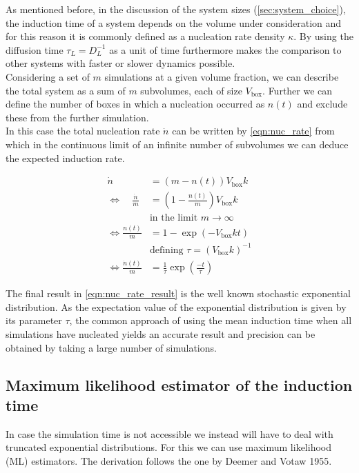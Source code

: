 As mentioned before, in the discussion of the system sizes (\autoref{sec:system_choice}), the induction time of a system depends on the volume under consideration and for this reason it is commonly defined as a nucleation rate density $\kappa$. By using the diffusion time $\tau_L = D_L^{-1}$ as a unit of time furthermore makes the comparison to other systems with faster or slower dynamics possible.\\

Considering a set of $m$ simulations at a given volume fraction, we can describe the total system as a sum of $m$ subvolumes, each of size $V_{\text{box}}$.  Further we can define the number of boxes in which a nucleation occurred as $n(t)$ and exclude these from the further simulation.\\

In this case the total nucleation rate $ \dot{n} $ can be written by \autoref{eqn:nuc_rate} from which in the continuous limit of an infinite number of subvolumes we can deduce the expected induction rate.

\begin{align}
\label{eqn:nuc_rate}
\dot{n} &= (m - n(t))V_{\text{box}}k\\
\Leftrightarrow \quad \!\frac{\dot{n}}{m} &= \left(1 - \frac{n(t)}{m}\right) V_{\text{box}}k \nonumber\\
 &  \text{in the limit } m \rightarrow \infty \nonumber\\
\Leftrightarrow \frac{n(t)}{m} &= 1 - \exp\left( -V_{\text{box}} k t \right)\\
 &  \text{defining } \tau = (V_{\text{box}} k)^{-1} \nonumber\\
\label{eqn:nuc_rate_result}
\Leftrightarrow \frac{\dot{n}(t)}{m} &= \frac{1}{\tau} \exp\left( \frac{-t}{\tau} \right) 
\end{align}

The final result in \autoref{eqn:nuc_rate_result} is the well known stochastic exponential distribution. As the expectation value of the exponential distribution is given by its parameter $\tau$, the common approach of using the mean induction time when all simulations have nucleated yields an accurate result and precision can be obtained by taking a large number of simulations.

\subsection{Maximum likelihood estimator of the induction time}
\label{sec:ml_estimator}
In case the simulation time is not accessible we instead will have to deal with truncated exponential distributions. For this we can use maximum likelihood (ML) estimators. The derivation follows the one by Deemer and Votaw 1955\cite{Deemer1955}.\\


